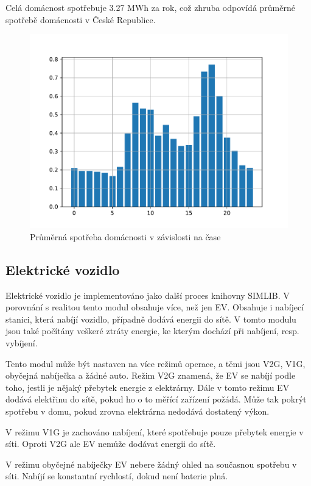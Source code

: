\documentclass[12pt,a4paper]{article}
\begin{document}
Celá domácnost spotřebuje 3.27 MWh za rok, což zhruba odpovídá průměrné spotřebě domácnosti v České Republice\cite{CEZ}.



\begin{figure}
\includegraphics[width=\linewidth]{img/average_day_load.pdf}
\caption{Průměrná spotřeba domácnosti v závislosti na čase}
\label{fig:average_day_load}
\end{figure}

\subsection{Elektrické vozidlo}
Elektrické vozidlo je implementováno jako další proces knihovny SIMLIB.
V porovnání s realitou tento modul obsahuje více, než jen EV.
Obsahuje i nabíjecí stanici, která nabíjí vozidlo, případně dodává energii do sítě.
V tomto modulu jsou také počítány veškeré ztráty energie, ke kterým dochází při nabíjení, resp. vybíjení.

Tento modul může být nastaven na více režimů operace, a těmi jsou V2G, V1G, obyčejná nabíječka a žádné auto.
Režim V2G znamená, že EV se nabíjí podle toho, jestli je nějaký přebytek energie z elektrárny.
Dále v tomto režimu EV dodává elektřinu do sítě, pokud ho o to měřící zařízení požádá.
Může tak pokrýt spotřebu v domu, pokud zrovna elektrárna nedodává dostatený výkon.

V režimu V1G je zachováno nabíjení, které spotřebuje pouze přebytek energie v síti.
Oproti V2G ale EV nemůže dodávat energii do sítě.

V režimu obyčejné nabíječky EV nebere žádný ohled na současnou spotřebu v síti.
Nabíjí se konstantní rychlostí, dokud není baterie plná.
\end{document}
